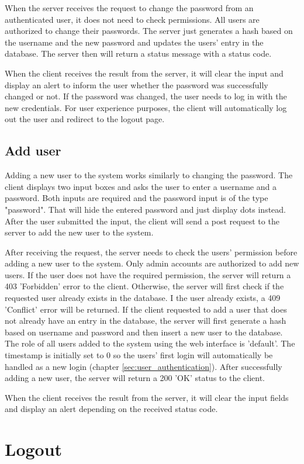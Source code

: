 When the server receives the request to change the password from an authenticated user, it does not need to check permissions. All users are authorized to change their passwords. The server just generates a hash based on the username and the new password and updates the users' entry in the database. The server then will return a status message with a status code.

When the client receives the result from the server, it will clear the input and display an alert to inform the user whether the password was successfully changed or not. If the password was changed, the user needs to log in with the new credentials. For user experience purposes, the client will automatically log out the user and redirect to the logout page.


\subsection{Add user}
\label{subsec:add_user}
Adding a new user to the system works similarly to changing the password. The client displays two input boxes and asks the user to enter a username and a password. Both inputs are required and the password input is of the type "password". That will hide the entered password and just display dots instead. After the user submitted the input, the client will send a post request to the server to add the new user to the system.

After receiving the request, the server needs to check the users' permission before adding a new user to the system. Only admin accounts are authorized to add new users. If the user does not have the required permission, the server will return a 403 'Forbidden' error to the client. Otherwise, the server will first check if the requested user already exists in the database.  I the user already exists, a 409 'Conflict' error will be returned. If the client requested to add a user that does not already have an entry in the database,  the server will first generate a hash based on username and password and then insert a new user to the database. The role of all users added to the system using the web interface is 'default'. The timestamp is initially set to 0 so the users' first login will automatically be handled as a new login (chapter \ref{sec:user_authentication}). After successfully adding a new user, the server will return a 200 'OK' status to the client.

When the client receives the result from the server, it will clear the input fields and display an alert depending on the received status code.



\section{Logout}
\label{sec:logout}
